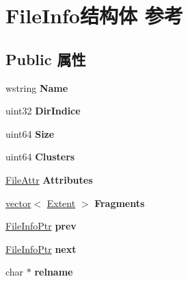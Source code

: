 \hypertarget{struct_file_info}{}\section{File\+Info结构体 参考}
\label{struct_file_info}
\subsection*{Public 属性}
\begin{DoxyCompactItemize}
\item 
\mbox{\label{struct_file_info_ad3bb2141b3fd717eadd94821abdcf9b9}} 
wstring {\bfseries Name}
\item 
\mbox{\label{struct_file_info_a66af2ab07bfaf5e45c354405617ca8e8}} 
uint32 {\bfseries Dir\+Indice}
\item 
\mbox{\label{struct_file_info_a7203ae27b5ae1cc20d2f9f751f7abb5a}} 
uint64 {\bfseries Size}
\item 
\mbox{\label{struct_file_info_a6a44581c011f59211623390914a75e68}} 
uint64 {\bfseries Clusters}
\item 
\mbox{\label{struct_file_info_a3da7e47d8a5c8145fd417e35ab3ec290}} 
\hyperlink{struct_file_attr}{File\+Attr} {\bfseries Attributes}
\item 
\mbox{\label{struct_file_info_a0d034f791ed13e066751714348d57016}} 
\hyperlink{structvector}{vector}$<$ \hyperlink{struct_extent}{Extent} $>$ {\bfseries Fragments}
\item 
\mbox{\label{struct_file_info_a2b2842ccac367b22c0a3942c6231751e}} 
\hyperlink{struct_file_info}{File\+Info\+Ptr} {\bfseries prev}
\item 
\mbox{\label{struct_file_info_aca6b2521f3de68d625081cfad27587be}} 
\hyperlink{struct_file_info}{File\+Info\+Ptr} {\bfseries next}
\item 
\mbox{\label{struct_file_info_afc670a5089a762a831f5965bfaebc627}} 
char $\ast$ {\bfseries relname}
\item 

\end{DoxyCompactItemize}
